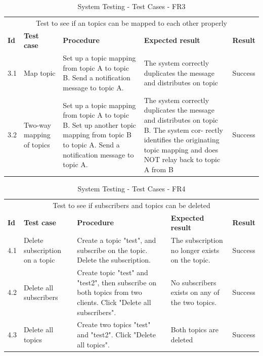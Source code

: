 \begin{table}[ht!]
\begin{tabular}{|m{1cm}|m{2cm}|m{4cm}|m{3cm}|m{1cm}|}
\hline
\rowcolor{lightgray}
\multicolumn{5}{|c|}{\textbf{FR3, Topic mapping}} \\ \hline
\multicolumn{5}{|c|}{{Test to see if an topics can be mapped to each other properly}} \\ \hline
\textbf{Id} & \textbf{Test case} & \textbf{Procedure} & \textbf{Expected result} & \textbf{Result} \\ \hline
3.1 & Map topic & Set up a topic mapping from topic A to topic B.
Send a notification message to topic A. & The  system  correctly  duplicates  the  message
and distributes on topic & Success \\ \hline
3.2 & Two-way mapping of topics & Set up a topic mapping from topic A to topic
B. Set up another topic mapping from topic B
to topic A. Send a notification message to topic
A. & The  system  correctly  duplicates  the  message
and  distributes  on  topic  B.  The  system  cor-
rectly identifies the originating topic mapping
and does NOT relay back to topic A from B & Success \\ \hline

\end{tabular}
\caption{System Testing - Test Cases - FR3}
\label{table:system-testing-cases-fr3}
\end{table}


\begin{table}[ht!]
\begin{tabular}{|m{1cm}|m{2cm}|m{4cm}|m{3cm}|m{1cm}|}
\hline
\rowcolor{lightgray}
\multicolumn{5}{|c|}{\textbf{FR3, Edit subscription}} \\ \hline
\multicolumn{5}{|c|}{{Test to see if subscribers and topics can be deleted}} \\ \hline
\textbf{Id} & \textbf{Test case} & \textbf{Procedure} & \textbf{Expected result} & \textbf{Result} \\ \hline
4.1 & Delete subscription on a topic & Create a topic "test", and subscribe on the topic. Delete the subscription. & The subscription no longer exists on the topic. & Success \\ \hline
4.2 & Delete all subscribers & Create topic "test" and "test2", then subscribe on both topics from two clients. Click "Delete all subscribers". & No subscribers exists on any of the two topics. & Success \\ \hline
4.3 & Delete all topics & Create two topics "test" and "test2". Click "Delete all topics". & Both topics are deleted & Success \\ \hline

\end{tabular}
\caption{System Testing - Test Cases - FR4}
\label{table:system-testing-cases-fr4}
\end{table}

